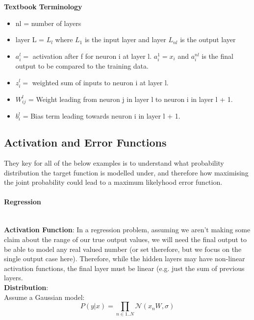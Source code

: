 \documentclass[a4paper]{article}
\begin{document}
    \textbf{Textbook Terminology}
    
    \begin{itemize}
        \item nl = number of layers
        \item layer L =  $L_l$ where $L_1$ is the input layer and layer $L_{nl}$ is the output layer
        \item $a_i^l = $ activation after f for neuron i at layer l. $a_i^1 = x_i$ and $a_i^{nl}$  is the final output to be compared to the training data.
        \item $z_i^l = $ weighted sum of inputs to neuron i at layer l.
        \item $W_{ij}^l$ = Weight leading from neuron j in layer l to neuron i in layer l + 1.
        \item $b_i^l$ = Bias term leading towards neuron i in layer l + 1.
    \end{itemize}
    
    \subsection{Activation and Error Functions}
    
    They key for all of the below examples is to understand what probability distribution the target function is modelled under, and therefore how maximising the joint probability could lead to a maximum likelyhood error function.
    
    \paragraph{Regression \\ \\ }
    
    \textbf{Activation Function}: In a regression problem, assuming we aren't making some claim about the range of our true output values, we will need the final output to be able to model any real valued number (or set therefore, but we focus on the single output case here).
    Therefore, while the hidden layers may have non-linear activation functions, the final layer must be linear (e.g. just the sum of previous layers. \\ 
    
    \textbf{Distribution}: \\
    
    Assume a Gaussian model: $$P(y | x) = \prod_{n \in 1..N} \mathcal{N}(x_nW, \sigma)$$
    
\end{document}
